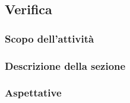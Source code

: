 \subsection{Verifica}
\subsubsection{Scopo dell'attività} 
\subsubsection{Descrizione della sezione} 
\subsubsection{Aspettative}